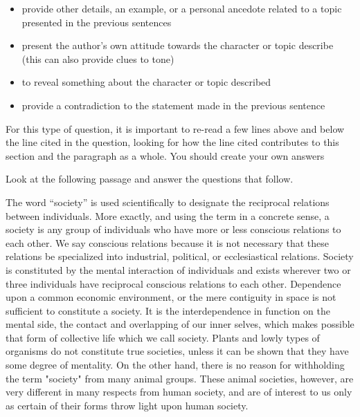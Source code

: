 \bigskip
\begin{itemize}
\bigskip
\item provide other details, an example, or a personal ancedote related to a topic presented in the previous sentences

\bigskip
\item present the author's own attitude towards the character or topic describe (this can also provide clues to tone)

\bigskip
\item to reveal something about the character or topic described

\bigskip
\item provide a contradiction to the statement made in the previous sentence

\end{itemize}


For this type of question, it is important to re-read a few lines above and below the line cited in the question, looking for how the line cited contributes to this section and the paragraph as a whole. You should create your own answers

Look at the following passage and answer the questions that follow. 

\begin{linenumbers*}
\modulolinenumbers[5]
The word ``society'' is used scientifically to designate the reciprocal relations between individuals. More exactly, and using the term in a concrete sense, a society is any group of individuals who have more or less conscious relations to each other. We say conscious relations because it is not necessary that these relations be specialized into industrial, political, or ecclesiastical relations. Society is constituted by the mental interaction of individuals and exists wherever two or three individuals have reciprocal conscious relations to each other. Dependence upon a common economic environment, or the mere contiguity in space is not sufficient to constitute a society. It is the interdependence in function on the mental side, the contact and overlapping of our inner selves, which makes possible that form of collective life which we call society. Plants and lowly types of organisms do not constitute true societies, unless it can be shown that they have some degree of mentality. On the other hand, there is no reason for withholding the term "society" from many animal groups. These animal societies, however, are very different in many respects from human society, and are of interest to us only as certain of their forms throw light upon human society.
\end{linenumbers*}

